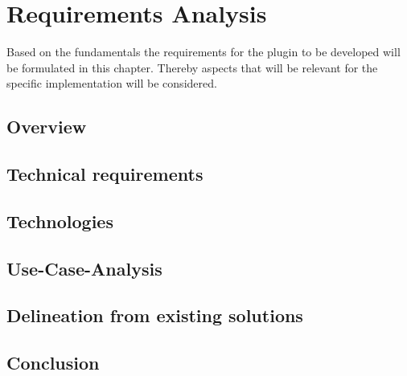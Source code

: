 \acresetall

\chapter{Requirements Analysis}\label{chapter:requirements-analysis}
Based on the fundamentals the requirements for the plugin to be developed will be formulated in this chapter.
Thereby aspects that will be relevant for the specific implementation will be considered.

\section{Overview}
\doit

\section{Technical requirements}
\doit

\section{Technologies}
\doit

\section{Use-Case-Analysis}
\doit

\section{Delineation from existing solutions}
\doit

\section{Conclusion}
\doit
